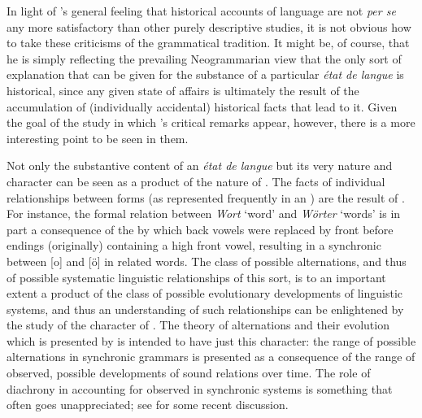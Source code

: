 In light of {\Baudouin}'s general feeling that historical accounts of
language are not \emph{per se} any more satisfactory than other purely
descriptive studies, it is not obvious how to take these criticisms of
the  grammatical tradition. It might be, of course, that he is
simply reflecting the prevailing Neogrammarian view that the only sort
of {explanation} that can be given for the substance of a particular
\emph{état de langue} is historical, since any given state of affairs is
ultimately the result of the accumulation of (individually accidental)
historical facts that lead to it. Given the goal of the study in which
{\Baudouin}'s critical remarks appear, however, there is a more
interesting point to be seen in them.

Not only the substantive content of an \emph{état de langue} but its
very nature and character can be seen as a product of the nature of
. The facts of individual relationships between forms
(as represented frequently in an ) are the result of
. For instance, the formal relation between 
\emph{Wort} `word' and \emph{Wörter} `words' is in part a consequence
of the  by which back vowels were replaced by front
before endings (originally) containing a high front vowel, resulting
in a synchronic  between {[o]} and {[ö]} in related
words. The class of possible alternations, and thus of possible
systematic linguistic relationships of this sort, is to an important
extent a product of the class of possible evolutionary developments of
linguistic systems, and thus an understanding of such relationships
can be enlightened by the study of the character of . The theory of alternations and their evolution which is
presented by \citet{baudouin95:attempt} is intended to have just this
character: the range of possible alternations in synchronic grammars
is presented as a consequence of the range of observed, possible
developments of sound relations over time. The role of diachrony in
accounting for observed  in synchronic systems is
something that often goes unappreciated; see
\citet{sra16:explanations} for some recent discussion.

